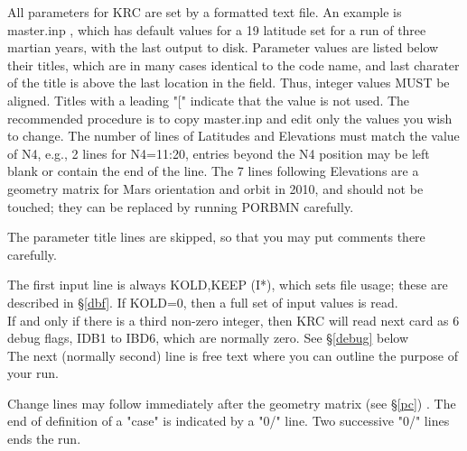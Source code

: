 \documentclass[draft]{article}  %
\newcommand{\qi}{\\ \hspace*{2.em}}      %
\begin{document}
All parameters for KRC are set by a formatted text file.  An example is
master.inp , which has default values for a 19 latitude set for a run of three
martian years, with the last output to disk. Parameter values are listed below
their titles, which are in many cases identical to the code name, and last
charater of the title is above the last location in the field. Thus, integer
values MUST be aligned. Titles with a leading "[" indicate that the value is not
used. The recommended procedure is to copy master.inp and edit only the values
you wish to change. The number of lines of Latitudes and Elevations must match
the value of N4, e.g., 2 lines for N4=11:20, entries beyond the N4 position may
be left blank or contain the end of the line. The 7 lines following Elevations
are a geometry matrix for Mars orientation and orbit in 2010, and should not be
touched; they can be replaced by running PORBMN carefully.

The parameter title lines are skipped, so that you may put comments there carefully.

The first input line is always KOLD,KEEP (I*), which sets file usage; these are
described in \S \ref{dbf}. If KOLD=0, then a full set of input values is read.
\qi If and only if there is a third non-zero integer, then KRC will read next
card as 6 debug flags, IDB1 to IBD6, which are normally zero.
  See \S \ref{debug} below \\
The next (normally second) line is free text where you can outline the purpose 
of your run.

Change lines may follow immediately after the geometry matrix (see \S \ref{pc})
. The end of definition of a "case" is indicated by a "0/" line. Two successive
"0/" lines ends the run.
\end{document}
